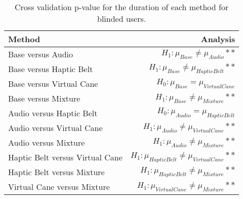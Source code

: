 
\begin{table}[!htb]
\centering
\caption{Cross validation p-value for the duration of each method for blinded users.}
\label{tab:lsd_duration}
\begin{tabular}{lr}
\toprule
                         Method &                                           Analysis \\
\midrule
              Base versus Audio &               $H_1 : \mu_{Base} \ne \mu_{Audio}**$ \\
        Base versus Haptic Belt &         $H_1 : \mu_{Base} \ne \mu_{Haptic Belt}**$ \\
       Base versus Virtual Cane &            $H_0 : \mu_{Base} = \mu_{Virtual Cane}$ \\
            Base versus Mixture &             $H_1 : \mu_{Base} \ne \mu_{Mixture}**$ \\
       Audio versus Haptic Belt &            $H_0 : \mu_{Audio} = \mu_{Haptic Belt}$ \\
      Audio versus Virtual Cane &       $H_1 : \mu_{Audio} \ne \mu_{Virtual Cane}**$ \\
           Audio versus Mixture &            $H_1 : \mu_{Audio} \ne \mu_{Mixture}**$ \\
Haptic Belt versus Virtual Cane & $H_1 : \mu_{Haptic Belt} \ne \mu_{Virtual Cane}**$ \\
     Haptic Belt versus Mixture &      $H_1 : \mu_{Haptic Belt} \ne \mu_{Mixture}**$ \\
    Virtual Cane versus Mixture &     $H_1 : \mu_{Virtual Cane} \ne \mu_{Mixture}**$ \\
\bottomrule
\end{tabular}
\end{table}

